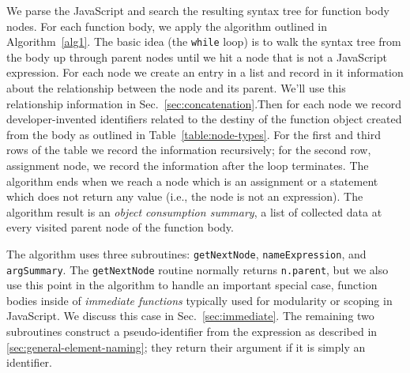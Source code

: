 \documentclass[10pt, preprint]{sigplanconf}
\begin{document}
We parse the JavaScript and search the resulting syntax tree for function body nodes. For each function body, we apply the algorithm outlined in Algorithm~\ref{alg1}. The basic idea (the \verb|while| loop) is to walk the syntax tree from the body up through parent nodes until we hit a node that is not a JavaScript expression. For each node we create an entry in a list and record in it information about the relationship between the node and its parent. We'll use this relationship information in Sec.~\ref{sec:concatenation}.Then for each node  we record developer-invented identifiers related to the destiny of the function object created from the body as outlined in  Table~\ref{table:node-types}. For the first and third rows of the table we record the information recursively; for the second row,  assignment node, we record the information after the loop terminates.   The algorithm ends when we reach a node which is an assignment or a statement which does not return any value (i.e., the node is not an expression).  The algorithm result is an \textit{object consumption summary}, a list of collected data at every visited parent node of the function body.

The algorithm uses three subroutines: \verb|getNextNode|,  \verb|nameExpression|, and \verb|argSummary|. The \verb|getNextNode| routine normally returns \verb|n.parent|, but we also use this point in the algorithm to handle an important special case, function bodies inside of \textit{immediate functions} typically used for modularity or scoping in JavaScript. We discuss this case in Sec.~\ref{sec:immediate}. The remaining two subroutines construct a pseudo-identifier from the expression as described in \ref{sec:general-element-naming}; they return their argument if it is simply an identifier.  


\renewcommand{\algorithmicrequire}{\textbf{Input:}}
\renewcommand{\algorithmicensure}{\textbf{Output:}}
\end{document}
